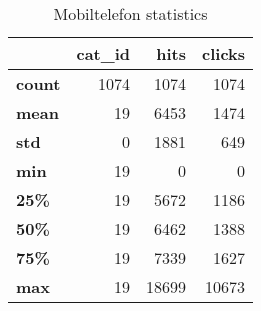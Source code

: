 \begin{table}[htbp]
\centering
\caption{Mobiltelefon statistics}
\label{table:Mobiltelefon_statistics}
\begin{tabular}{lrrr}
\toprule
{} &  cat\_id &  hits &  clicks \\
\midrule
\textbf{count} &    1074 &  1074 &    1074 \\
\textbf{mean } &      19 &  6453 &    1474 \\
\textbf{std  } &       0 &  1881 &     649 \\
\textbf{min  } &      19 &     0 &       0 \\
\textbf{25\%  } &      19 &  5672 &    1186 \\
\textbf{50\%  } &      19 &  6462 &    1388 \\
\textbf{75\%  } &      19 &  7339 &    1627 \\
\textbf{max  } &      19 & 18699 &   10673 \\
\bottomrule
\end{tabular}
\end{table}
